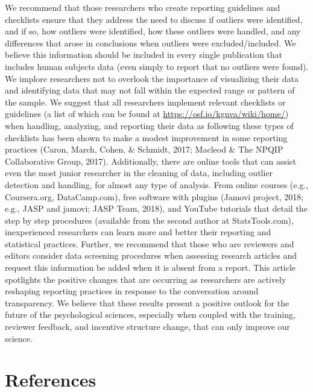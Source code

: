 \documentclass[english,,man,mask]{apa6}
\theoremstyle{definition}
\theoremstyle{definition}
\theoremstyle{definition}
\theoremstyle{remark}
\begin{document}
We recommend that those researchers who create reporting guidelines and
checklists ensure that they address the need to discuss if outliers were
identified, and if so, how outliers were identified, how these outliers
were handled, and any differences that arose in conclusions when
outliers were excluded/included. We believe this information should be
included in every single publication that includes human subjects data
(even simply to report that no outliers were found). We implore
researchers not to overlook the importance of visualizing their data and
identifying data that may not fall within the expected range or pattern
of the sample. We suggest that all researchers implement relevant
checklists or guidelines (a list of which can be found at
\url{https://osf.io/kgnva/wiki/home/}) when handling, analyzing, and
reporting their data as following these types of checklists has been
shown to make a modest improvement in some reporting practices (Caron,
March, Cohen, \& Schmidt, 2017; Macleod \& The NPQIP Collaborative
Group, 2017). Additionally, there are online tools that can assist even
the most junior researcher in the cleaning of data, including outlier
detection and handling, for almost any type of analysis. From online
courses (e.g., Coursera.org, DataCamp.com), free software with plugins
(Jamovi project, 2018; e.g., JASP and jamovi; JASP Team, 2018), and
YouTube tutorials that detail the step by step procedures (available
from the second author at StatsTools.com), inexperienced researchers can
learn more and better their reporting and statistical practices.
Further, we recommend that those who are reviewers and editors consider
data screening procedures when assessing research articles and request
this information be added when it is absent from a report. This article
spotlights the positive changes that are occurring as researchers are
actively reshaping reporting practices in response to the conversation
around transparency. We believe that these results present a positive
outlook for the future of the psychological sciences, especially when
coupled with the training, reviewer feedback, and incentive structure
change, that can only improve our science.

\newpage

\section{References}\label{references}

\setlength{\parindent}{-0.5in} \setlength{\leftskip}{0.5in}
\end{document}
